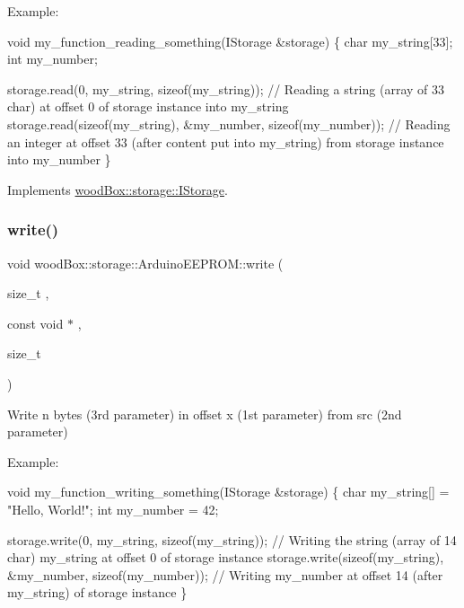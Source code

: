 Example\+:


\begin{DoxyCode}
\textcolor{keywordtype}{void} my\_function\_reading\_something(IStorage &storage) \{
  \textcolor{keywordtype}{char} my\_string[33];
  \textcolor{keywordtype}{int} my\_number;

  storage.read(0, my\_string, \textcolor{keyword}{sizeof}(my\_string)); \textcolor{comment}{// Reading a string (array of 33 char) at offset 0 of
       storage instance into my\_string}
  storage.read(\textcolor{keyword}{sizeof}(my\_string), &my\_number, \textcolor{keyword}{sizeof}(my\_number)); \textcolor{comment}{// Reading an integer at offset 33 (after
       content put into my\_string) from storage instance into my\_number}
\}
\end{DoxyCode}
 

Implements \mbox{\hyperlink{classwood_box_1_1storage_1_1_i_storage_a01bab924be0844e3866b27279caa506d}{wood\+Box\+::storage\+::\+I\+Storage}}.

\mbox{\label{classwood_box_1_1storage_1_1_arduino_e_e_p_r_o_m_af78d2077806af7e1aac65d6890915d77}} 
\subsubsection{\texorpdfstring{write()}{write()}}
{\footnotesize\ttfamily void wood\+Box\+::storage\+::\+Arduino\+E\+E\+P\+R\+O\+M\+::write (\begin{DoxyParamCaption}\item[{size\+\_\+t}]{,  }\item[{const void $\ast$}]{,  }\item[{size\+\_\+t}]{ }\end{DoxyParamCaption})\hspace{0.3cm}{\ttfamily [virtual]}}

Write n bytes (3rd parameter) in offset x (1st parameter) from src (2nd parameter)

Example\+:


\begin{DoxyCode}
\textcolor{keywordtype}{void} my\_function\_writing\_something(IStorage &storage) \{
  \textcolor{keywordtype}{char} my\_string[] = \textcolor{stringliteral}{"Hello, World!"};
  \textcolor{keywordtype}{int} my\_number = 42;

  storage.write(0, my\_string, \textcolor{keyword}{sizeof}(my\_string)); \textcolor{comment}{// Writing the string (array of 14 char) my\_string at
       offset 0 of storage instance}
  storage.write(\textcolor{keyword}{sizeof}(my\_string), &my\_number, \textcolor{keyword}{sizeof}(my\_number)); \textcolor{comment}{// Writing my\_number at offset 14 (after
       my\_string) of storage instance}
\}
\end{DoxyCode}
 

